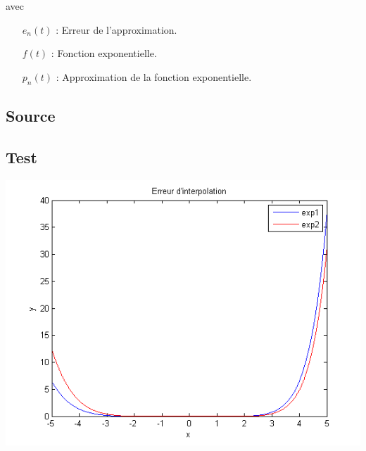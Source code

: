 \documentclass[a4paper,10pt]{report}
\begin{document}
avec

\begin{list}{}{}
\item
\begin{itemize}
	\item[$e_{n}(t)$]: Erreur de l'approximation.
	\item[$f(t)$]: Fonction exponentielle.
	\item[$p_{n}(t)$]: Approximation de la fonction exponentielle.
\end{itemize}
\end{list}

\subsection*{Source}
\begin{center}
	
\end{center}

\subsection*{Test}

\begin{center}
	\includegraphics[scale=0.8]{erreur.png} 
\end{center}
\end{document}
